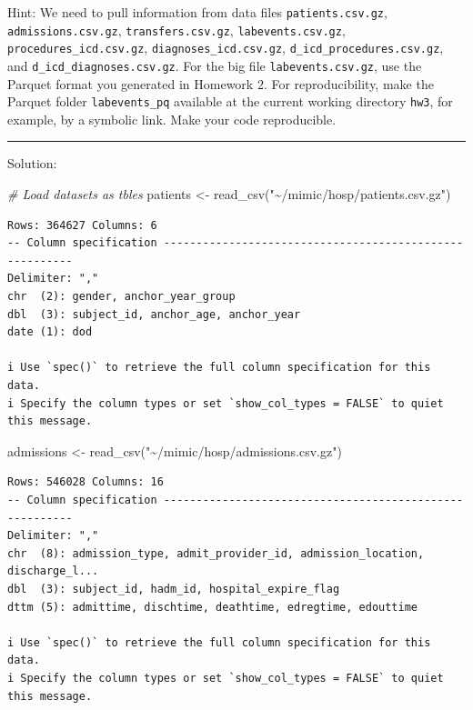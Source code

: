 \documentclass[
]{article}
\newenvironment{Shaded}{\begin{snugshade}}{\end{snugshade}}
\newcommand{\CommentTok}[1]{\textcolor[rgb]{0.56,0.35,0.01}{\textit{#1}}}
\newcommand{\FunctionTok}[1]{\textcolor[rgb]{0.00,0.00,0.00}{#1}}
\newcommand{\NormalTok}[1]{\textcolor[rgb]{0.00,0.00,0.00}{#1}}
\newcommand{\OtherTok}[1]{\textcolor[rgb]{0.56,0.35,0.01}{#1}}
\newcommand{\StringTok}[1]{\textcolor[rgb]{0.31,0.60,0.02}{#1}}
\begin{document}
Hint: We need to pull information from data files
\texttt{patients.csv.gz}, \texttt{admissions.csv.gz},
\texttt{transfers.csv.gz}, \texttt{labevents.csv.gz},
\texttt{procedures\_icd.csv.gz}, \texttt{diagnoses\_icd.csv.gz},
\texttt{d\_icd\_procedures.csv.gz}, and
\texttt{d\_icd\_diagnoses.csv.gz}. For the big file
\texttt{labevents.csv.gz}, use the Parquet format you generated in
Homework 2. For reproducibility, make the Parquet folder
\texttt{labevents\_pq} available at the current working directory
\texttt{hw3}, for example, by a symbolic link. Make your code
reproducible.

\begin{center}\rule{0.5\linewidth}{0.5pt}\end{center}

Solution:

\begin{Shaded}
\begin{Highlighting}[]
\CommentTok{\# Load datasets as tbles}
\NormalTok{patients }\OtherTok{\textless{}{-}} \FunctionTok{read\_csv}\NormalTok{(}\StringTok{"\textasciitilde{}/mimic/hosp/patients.csv.gz"}\NormalTok{)}
\end{Highlighting}
\end{Shaded}

\begin{verbatim}
Rows: 364627 Columns: 6
-- Column specification --------------------------------------------------------
Delimiter: ","
chr  (2): gender, anchor_year_group
dbl  (3): subject_id, anchor_age, anchor_year
date (1): dod

i Use `spec()` to retrieve the full column specification for this data.
i Specify the column types or set `show_col_types = FALSE` to quiet this message.
\end{verbatim}

\begin{Shaded}
\begin{Highlighting}[]
\NormalTok{admissions }\OtherTok{\textless{}{-}} \FunctionTok{read\_csv}\NormalTok{(}\StringTok{"\textasciitilde{}/mimic/hosp/admissions.csv.gz"}\NormalTok{)}
\end{Highlighting}
\end{Shaded}

\begin{verbatim}
Rows: 546028 Columns: 16
-- Column specification --------------------------------------------------------
Delimiter: ","
chr  (8): admission_type, admit_provider_id, admission_location, discharge_l...
dbl  (3): subject_id, hadm_id, hospital_expire_flag
dttm (5): admittime, dischtime, deathtime, edregtime, edouttime

i Use `spec()` to retrieve the full column specification for this data.
i Specify the column types or set `show_col_types = FALSE` to quiet this message.
\end{verbatim}
\end{document}
